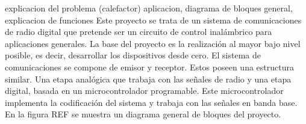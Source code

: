 explicacion del problema (calefactor) aplicacion, diagrama de bloques general, explicacion de funciones
Este proyecto se trata de un sistema de comunicaciones de radio digital que pretende ser un circuito de control inalámbrico para aplicaciones generales. 
La base del proyecto es la realización al mayor bajo nivel posible, es decir, desarrollar los dispositivos desde cero.
El sistema de comunicaciones se compone de emisor y receptor. Estos poseen una estructura similar. Una etapa analógica que trabaja con las señales de radio y una etapa digital, basada en un microcontrolador programable. Este microcontrolador implementa la codificación del sistema y trabaja con las señales en banda base.
En la figura REF se muestra un diagrama general de bloques del proyecto.
